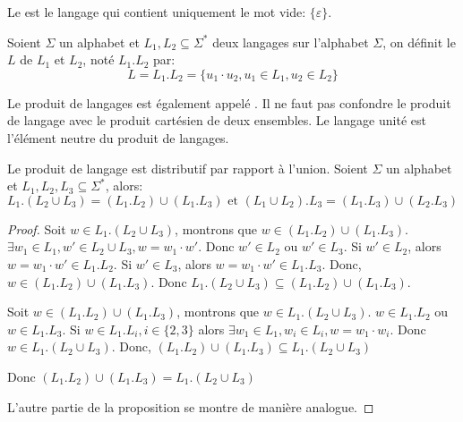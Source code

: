 \begin{definition}
    Le  est le langage qui contient uniquement le mot vide: \( \{ \varepsilon \} \).
\end{definition}


\begin{definition}
    Soient \( \Sigma \) un alphabet et \( L_1, L_2 \subseteq \Sigma^* \) deux langages sur l'alphabet \( \Sigma \), on définit le  \( L \) de \( L_1 \) et \( L_2 \), noté \( L_1 . L_2 \) par:
    \begin{equation}
        L = L_1 . L_2 = \{ u_1 \cdot u_2, u_1 \in L_1, u_2 \in L_2 \}
    \end{equation}
\end{definition}

Le produit de langages est également appelé . Il ne faut pas confondre le produit de langage avec le produit cartésien de deux ensembles. Le langage unité est l'élément neutre du produit de langages.

\begin{proposition}
    Le produit de langage est distributif par rapport à l'union. Soient \( \Sigma \) un alphabet et \( L_1, L_2, L_3 \subseteq \Sigma^* \), alors:
    \begin{equation}
        L_1 . (L_2 \cup L_3) = (L_1 . L_2) \cup (L_1 . L_3) \text{ et } (L_1 \cup L_2) . L_3 = (L_1 . L_3) \cup (L_2 . L_3)
    \end{equation}
\end{proposition}

\begin{proof}
    Soit $w \in L_1 . (L_2 \cup L_3)$, montrons que $w \in (L_1 . L_2) \cup (L_1 . L_3)$.
    $\exists w_1 \in L_1, w' \in L_2 \cup L_3, w = w_1 \cdot w'$. Donc $w' \in L_2$ ou $w' \in L_3$.
    Si $w' \in L_2$, alors $w = w_1 \cdot w' \in L_1 . L_2$.
    Si $w' \in L_3$, alors $w = w_1 \cdot w' \in L_1 . L_3$.
    Donc, $w \in (L_1 . L_2) \cup (L_1 . L_3)$.
    Donc $L_1 . (L_2 \cup L_3) \subseteq (L_1 . L_2) \cup (L_1 . L_3)$.

    Soit $w \in (L_1 . L_2) \cup (L_1 . L_3)$, montrons que $w \in L_1 . (L_2 \cup L_3)$.
    $w \in L_1 . L_2$ ou $w \in L_1 . L_3$.
    Si $w \in L_1 . L_i, i \in \{ 2, 3\}$ alors $\exists w_1 \in L_1, w_i \in L_i, w = w_1 \cdot w_i$.
    Donc $w \in L_1 . (L_2 \cup L_3)$.
    Donc, $(L_1 . L_2) \cup (L_1 . L_3) \subseteq L_1 . (L_2 \cup L_3)$

    Donc $(L_1 . L_2) \cup (L_1 . L_3) = L_1 . (L_2 \cup L_3)$

    L'autre partie de la proposition se montre de manière analogue.
\end{proof}



